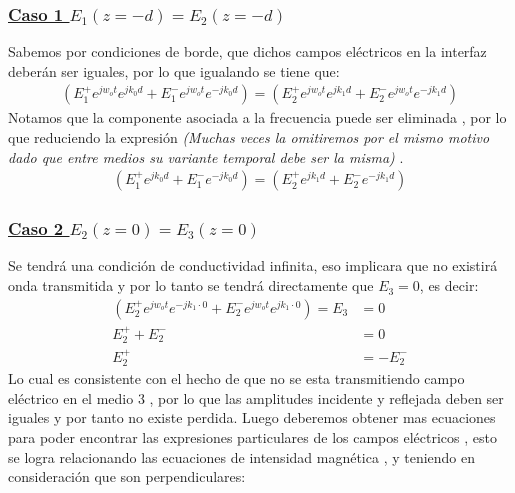 \documentclass[
  11pt,
  letterpaper,
   addpoints,
   answers
  ]{exam}
\begin{document}
\begin{questions}
\begin{solution}
\begin{enumerate}
            \subsubsection*{\underline{Caso 1 $E_{1}(z=-d)=E_{2}(z=-d)$}}
            Sabemos por condiciones de borde, que dichos campos eléctricos en la interfaz deberán ser iguales, por lo que igualando se tiene que:
            \begin{align}
                ( E_{1}^{+}e^{jw_{o}t}e^{jk_{0}d} +E_{1}^{-}e^{jw_{o}t}e^{-jk_{0}d})=( E_{2}^{+}e^{jw_{o}t}e^{jk_{1}d} +E_{2}^{-}e^{jw_{o}t}e^{-jk_{1}d})
            \end{align}
            Notamos que la componente asociada a la frecuencia puede ser eliminada , por lo que reduciendo la expresión \textit{(Muchas veces la omitiremos por el mismo motivo dado que entre medios su variante temporal debe ser la misma)} .
            \begin{align}
                ( E_{1}^{+}e^{jk_{0}d} +E_{1}^{-}e^{-jk_{0}d})=( E_{2}^{+}e^{jk_{1}d} +E_{2}^{-}e^{-jk_{1}d})
            \end{align}
            \subsubsection*{\underline{Caso 2 $E_{2}(z=0)=E_{3}(z=0)$ }}
            Se tendrá una condición de conductividad infinita, eso implicara que no existirá onda transmitida y por lo tanto se tendrá directamente que $E_{3} = 0$, es decir:
            \begin{align}
                ( E_{2}^{+}e^{jw_{o}t}e^{-jk_{1}\cdot 0} +E_{2}^{-}e^{jw_{o}t}e^{jk_{1}\cdot 0})= E_{3} &= 0 \\
                E_{2}^{+} + E_{2}^{-} &= 0 \\
                E_{2}^{+} &=  -  E_{2}^{-}
            \end{align}
            Lo cual es consistente con el hecho de que no se esta transmitiendo campo eléctrico en el medio 3 , por lo que las amplitudes incidente y reflejada deben ser iguales y por tanto no existe perdida. Luego deberemos obtener mas ecuaciones para poder encontrar las expresiones particulares de los campos eléctricos , esto se logra relacionando las ecuaciones de intensidad magnética , y teniendo en consideración que son perpendiculares:

\end{enumerate}
\end{solution}
\end{questions}
\end{document}
